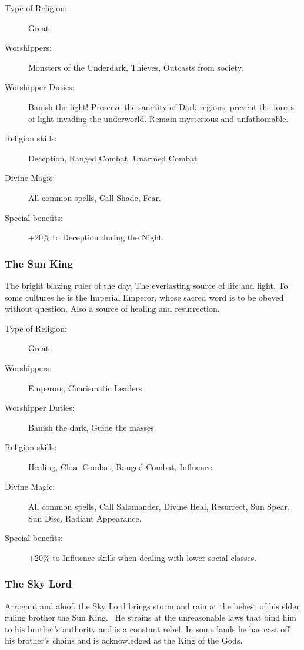 \begin{description}
\item[Type of Religion:] Great
\item[Worshippers:] Monsters of the Underdark, Thieves, Outcasts from society.
\item[Worshipper Duties:] Banish the light! Preserve the sanctity of Dark regions, prevent the forces of light invading the underworld. Remain mysterious and unfathomable.
\item[Religion skills:] Deception, Ranged Combat, Unarmed Combat
\item[Divine Magic:] All common spells, Call Shade, Fear.
\item[Special benefits:] +20\% to Deception during the Night.
\end{description}


\subsubsection{The Sun King}
The bright blazing ruler of the day. The everlasting source of life and light. To some cultures he is the Imperial Emperor, whose sacred word is to be obeyed without question. Also a source of healing and resurrection.

\begin{description}
\item[Type of Religion:] Great
\item[Worshippers:] Emperors, Charismatic Leaders
\item[Worshipper Duties:] Banish the dark, Guide the masses.
\item[Religion skills:] Healing, Close Combat, Ranged Combat, Influence.
\item[Divine Magic:] All common spells, Call Salamander, Divine Heal, Resurrect, Sun Spear, Sun Disc, Radiant Appearance.
\item[Special benefits:] +20\% to Influence skills when dealing with lower social classes.
\end{description}



\subsubsection{The Sky Lord}
Arrogant and aloof, the Sky Lord brings storm and rain at the behest of his elder ruling brother the Sun King.  He strains at the unreasonable laws that bind him to his brother’s authority and is a constant rebel. In some lands he has cast off his brother’s chains and is acknowledged as the King of the Gods.

